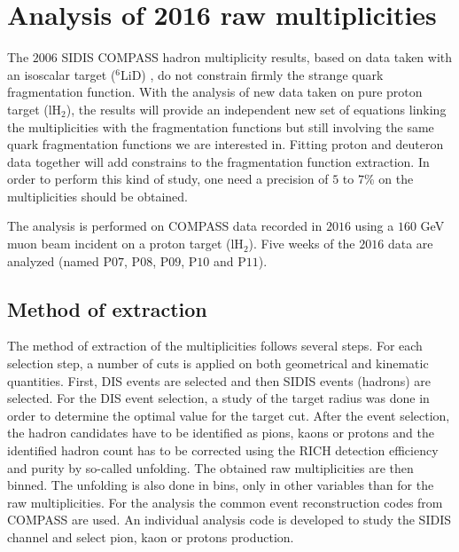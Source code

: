 
\chapter{Analysis of 2016 raw multiplicities} %

\label{ch:raw} %

The $2006$ SIDIS COMPASS hadron multiplicity results, based on data taken with an isoscalar target ($^6$LiD) \cite{COMPASS2006K}, do not constrain firmly the strange quark fragmentation function.
With the analysis of new data taken on pure proton target (lH$_2$), the results will provide an independent new set of equations linking the multiplicities with the fragmentation functions but still involving the same quark fragmentation functions we are interested in. Fitting proton and deuteron data together will add constrains to the fragmentation function extraction.
In order to perform this kind of study, one need a precision of $5$ to $7$\% on the multiplicities should be obtained.

The analysis is performed on COMPASS data recorded in $2016$ using a $160$ GeV muon beam incident on a proton target (lH$_2$). Five weeks of the $2016$ data are analyzed (named P$07$, P$08$, P$09$, P$10$ and P$11$).


\section{Method of extraction}

The method of extraction of the multiplicities follows several steps. For each selection step, a number of cuts is applied on both geometrical and kinematic quantities. First, DIS events are selected and then SIDIS events (hadrons) are selected. For the DIS event selection, a study of the target radius was done in order to determine the optimal value for the target cut. After the event selection, the hadron candidates have to be identified as pions, kaons or protons and the identified hadron count has to be corrected using the RICH detection efficiency and purity by so-called unfolding. The obtained raw multiplicities are then binned. The unfolding is also done in bins, only in other variables than for the raw multiplicities. For the analysis the common event reconstruction codes from COMPASS are used. An individual analysis code is developed to study the SIDIS channel and select pion, kaon or protons production.

